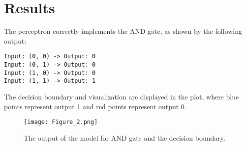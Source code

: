 \documentclass{article}
\begin{document}
\section*{Results}
The perceptron correctly implements the AND gate, as shown by the following output:
\begin{verbatim}
Input: (0, 0) -> Output: 0
Input: (0, 1) -> Output: 0
Input: (1, 0) -> Output: 0
Input: (1, 1) -> Output: 1
\end{verbatim}

The decision boundary and visualization are displayed in the plot, where blue points represent output 1 and red points represent output 0.

\begin{figure}[h!]
    \centering
    \texttt{[image: Figure\_2.png]} %
    \caption{The output of the model for AND gate and the decision boundary.}
    \label{fig:figure1}
\end{figure}
\end{document}
